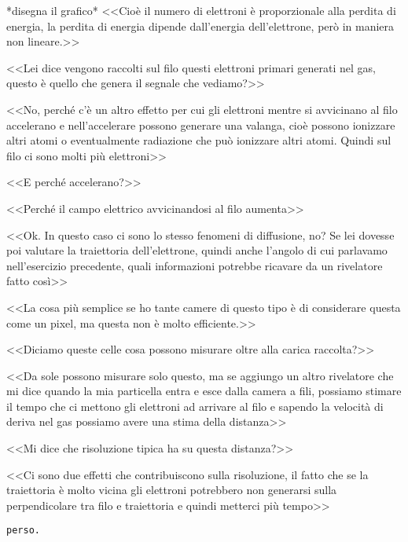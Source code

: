 \documentclass[../main.tex]{subfiles}
\begin{document}
\begin{enumerate}
{\begin{flushright}
        *disegna il grafico*
        <<Cioè il numero di elettroni è proporzionale alla perdita di energia, la perdita di energia dipende dall'energia dell'elettrone, però in maniera non lineare.>>
        \end{flushright}
        <<Lei dice vengono raccolti sul filo questi elettroni primari generati nel gas, questo è quello che genera il segnale che vediamo?>>
        \begin{flushright}
        <<No, perché c'è un altro effetto per cui gli elettroni mentre si avvicinano al filo accelerano e nell'accelerare possono generare una valanga, cioè possono ionizzare altri atomi o eventualmente radiazione che può ionizzare altri atomi. Quindi sul filo ci sono molti più elettroni>>
        \end{flushright}
        <<E perché accelerano?>>
        \begin{flushright}
        <<Perché il campo elettrico avvicinandosi al filo aumenta>>
        \end{flushright}
        <<Ok. In questo caso ci sono lo stesso fenomeni di diffusione, no? Se lei dovesse poi valutare la traiettoria dell'elettrone, quindi anche l'angolo di cui parlavamo nell'esercizio precedente, quali informazioni potrebbe ricavare da un rivelatore fatto così>>
        \begin{flushright}
        <<La cosa più semplice se ho tante camere di questo tipo è di considerare questa come un pixel, ma questa non è molto efficiente.>>
        \end{flushright}
        <<Diciamo queste celle cosa possono misurare oltre alla carica raccolta?>>
        \begin{flushright}
        <<Da sole possono misurare solo questo, ma se aggiungo un altro rivelatore che mi dice quando la mia particella entra e esce dalla camera a fili, possiamo stimare il tempo che ci mettono gli elettroni ad arrivare al filo e sapendo la velocità di deriva nel gas possiamo avere una stima della distanza>>
        \end{flushright}
        <<Mi dice che risoluzione tipica ha su questa distanza?>>
        \begin{flushright}
        <<Ci sono due effetti che contribuiscono sulla risoluzione, il fatto che se la traiettoria è molto vicina gli elettroni potrebbero non generarsi sulla perpendicolare tra filo e traiettoria e quindi metterci più tempo>>
        \end{flushright}
        }
        \texttt{perso.}
    \end{enumerate}
\end{document}
